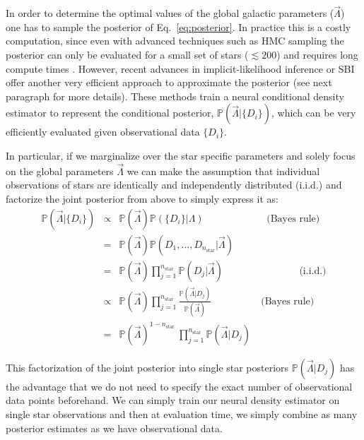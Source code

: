 \documentclass{aa}
\begin{document}
In order to determine the optimal values of the global galactic parameters ($\Vec{\Lambda}$) one has to sample the posterior of Eq.~\ref{eq:posterior}. In practice this is a costly computation, since even with advanced techniques such as HMC sampling the posterior can only be evaluated for a small set of stars ($\lesssim200$) and requires long compute times \citep[$\sim40$ hours][]{Philcox_2019}.
%
However, recent advances in implicit-likelihood inference or SBI \citep{Cranmer2020} offer another very efficient approach to approximate the posterior (see next paragraph for more details). These methods train a neural conditional density estimator to represent the conditional posterior, $\mathbb{P}(\vec\Lambda|\{D_i\})$, which can be very efficiently evaluated given observational data $\{D_i\}$.

In particular, if we marginalize over the star specific parameters and solely focus on the global parameters $\Vec{\Lambda}$ we can make the assumption that individual observations of stars are identically and independently distributed (i.i.d.) and factorize the joint posterior from above to simply express it as:  %
\begin{eqnarray}
\mathbb{P}(\vec\Lambda|\{D_i\}) &\propto& 
\mathbb{P}(\vec\Lambda)\mathbb{P}(\{D_i\}|\Lambda)\quad\quad\quad\quad\quad\quad\,\, \text{(Bayes rule)}
\\\nonumber
&=&
\mathbb{P}(\vec\Lambda)\mathbb{P}
(D_1,...,D_{n_\mathrm{star}}|\vec\Lambda)
\\\nonumber
&=& \mathbb{P}(\vec\Lambda)\prod_{j=1}^{n_\mathrm{star}}\mathbb{P}(D_j|\vec\Lambda) \quad\quad\quad\quad\quad\quad\quad\,\,\,\, \text{(i.i.d.)}
\\\nonumber
&\propto& \mathbb{P}(\vec\Lambda) \prod_{j=1}^{n_\mathrm{star}}\frac{\mathbb{P}(\vec\Lambda|D_j)}{\mathbb{P}(\vec\Lambda)} \quad\quad\quad\quad\quad\text{(Bayes rule)}
\\%
\label{eq:posterior}
&=& \mathbb{P}(\vec\Lambda)^{1-n_\mathrm{star}}\ \prod_{j=1}^{n_\mathrm{star}}\mathbb{P}(\vec\Lambda|D_j) 
\end{eqnarray}

This factorization of the joint posterior into single star posteriors $\mathbb{P}(\vec\Lambda|D_j)$ has the advantage that we do not need to specify the exact number of observational data points beforehand. We can simply train our neural density estimator on single star observations and then at evaluation time, we simply combine as many posterior estimates as we have observational data.
\end{document}
